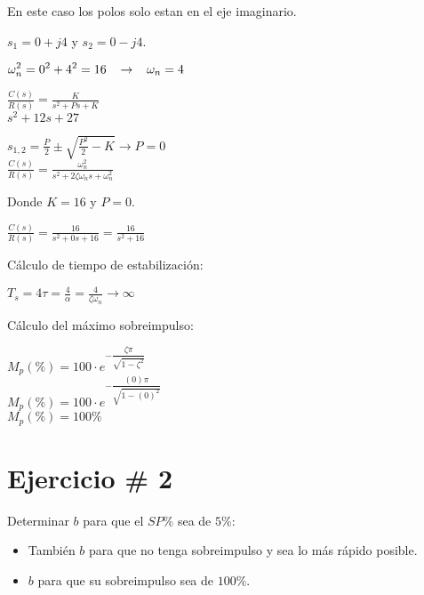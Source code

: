 \documentclass[12pt]{article}
\begin{document}
\begin{enumerate}
      En este caso los polos solo estan en el eje imaginario.

      $s_{1}=0+j4$ y $s_{2}=0-j4$.

      \( \displaystyle \omega_{n}^{2}= 0^2 + 4^2=16 \hspace{3mm} \rightarrow \hspace{3mm} \omega_{n}=4 \)

      \( \displaystyle \frac{C(s)}{R(s)} = \frac{K}{s^2 + Ps + K} \)\\

      \( \displaystyle s^2 + 12s + 27  \)

      \( \displaystyle s_{1,2} =  \frac{P}{2} \pm \sqrt{\frac{P^2}{2}-K} \rightarrow P=0 \)\\

      \( \displaystyle \frac{C(s)}{R(s)} = \frac{\omega_{n}^{2}}{s^2 + 2\zeta \omega_{n}s + \omega_{n}^{2}} \)

      Donde $K=16$ y $P=0$.

    \( \displaystyle \frac{C(s)}{R(s)} = \frac{16}{s^2 + 0s + 16} = \frac{16}{s^2+16} \)
 
    \vspace{1cm}

    C\'alculo de tiempo de estabilizaci\'on:

    \( \displaystyle T_{s} = 4 \tau = \frac{4}{\alpha} =
    \frac{4}{\zeta \omega_{n}} \rightarrow \infty  \)


    \vspace{3cm}

    C\'alculo del m\'aximo sobreimpulso:

    \( \displaystyle M_p(\%) = 100\cdot e^{- \dfrac{\zeta \pi}{\sqrt{1 - \zeta^{2}}}} \)\\
    \( \displaystyle M_p(\%) = 100\cdot e^{- \dfrac{(0)\pi}{\sqrt{1 - (0)^{2}}}} \)\\
    \( \displaystyle M_p(\%) = 100\% \)\\

\section*{Ejercicio \# 2}

Determinar $b$ para que el $SP\%$ sea de $5\%$:
\begin{itemize}
  \item Tambi\'en $b$ para que no tenga sobreimpulso y sea lo m\'as r\'apido posible.
  \item $b$ para que su sobreimpulso sea de $100\%$.
\end{itemize}


\end{enumerate}
\end{document}

